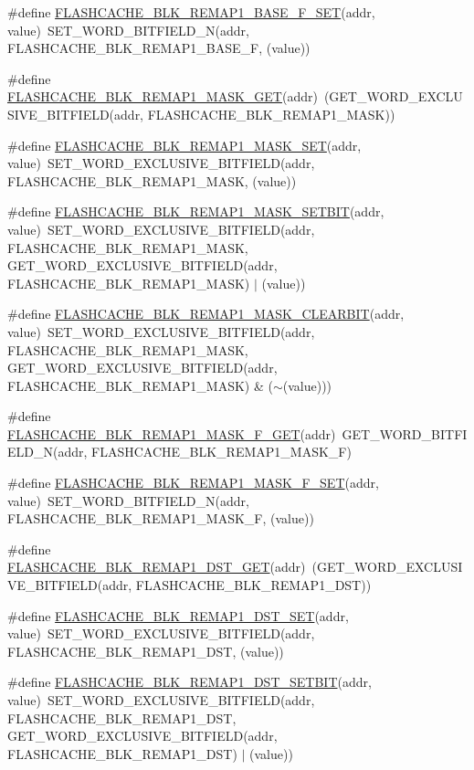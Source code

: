 \begin{DoxyCompactItemize}
\item 
\#define \hyperlink{a00549_a0d1c3dc65ea04ee05f71a5e7f1e5ed96}{FLASHCACHE\_\-BLK\_\-REMAP1\_\-BASE\_\-F\_\-SET}(addr, value)~SET\_\-WORD\_\-BITFIELD\_\-N(addr, FLASHCACHE\_\-BLK\_\-REMAP1\_\-BASE\_\-F, (value))
\item 
\#define \hyperlink{a00549_a02e18632dc84e504028ba479bc95174b}{FLASHCACHE\_\-BLK\_\-REMAP1\_\-MASK\_\-GET}(addr)~(GET\_\-WORD\_\-EXCLUSIVE\_\-BITFIELD(addr, FLASHCACHE\_\-BLK\_\-REMAP1\_\-MASK))
\item 
\#define \hyperlink{a00549_a4732aca9308ee7f76c34768c89ba202b}{FLASHCACHE\_\-BLK\_\-REMAP1\_\-MASK\_\-SET}(addr, value)~SET\_\-WORD\_\-EXCLUSIVE\_\-BITFIELD(addr, FLASHCACHE\_\-BLK\_\-REMAP1\_\-MASK, (value))
\item 
\#define \hyperlink{a00549_acb1fceafb6eef20404392848248e5be6}{FLASHCACHE\_\-BLK\_\-REMAP1\_\-MASK\_\-SETBIT}(addr, value)~SET\_\-WORD\_\-EXCLUSIVE\_\-BITFIELD(addr, FLASHCACHE\_\-BLK\_\-REMAP1\_\-MASK, GET\_\-WORD\_\-EXCLUSIVE\_\-BITFIELD(addr, FLASHCACHE\_\-BLK\_\-REMAP1\_\-MASK) $|$ (value))
\item 
\#define \hyperlink{a00549_aa13c833d086541859eaf0253330d6edc}{FLASHCACHE\_\-BLK\_\-REMAP1\_\-MASK\_\-CLEARBIT}(addr, value)~SET\_\-WORD\_\-EXCLUSIVE\_\-BITFIELD(addr, FLASHCACHE\_\-BLK\_\-REMAP1\_\-MASK, GET\_\-WORD\_\-EXCLUSIVE\_\-BITFIELD(addr, FLASHCACHE\_\-BLK\_\-REMAP1\_\-MASK) \& ($\sim$(value)))
\item 
\#define \hyperlink{a00549_aeb3a4503634ba6d96a2eaf6a365c0958}{FLASHCACHE\_\-BLK\_\-REMAP1\_\-MASK\_\-F\_\-GET}(addr)~GET\_\-WORD\_\-BITFIELD\_\-N(addr, FLASHCACHE\_\-BLK\_\-REMAP1\_\-MASK\_\-F)
\item 
\#define \hyperlink{a00549_a86d6e25f2f41bf8aaf9544f0c4b54798}{FLASHCACHE\_\-BLK\_\-REMAP1\_\-MASK\_\-F\_\-SET}(addr, value)~SET\_\-WORD\_\-BITFIELD\_\-N(addr, FLASHCACHE\_\-BLK\_\-REMAP1\_\-MASK\_\-F, (value))
\item 
\#define \hyperlink{a00549_a702cf670ad53c6ef52d3fab4be3741fd}{FLASHCACHE\_\-BLK\_\-REMAP1\_\-DST\_\-GET}(addr)~(GET\_\-WORD\_\-EXCLUSIVE\_\-BITFIELD(addr, FLASHCACHE\_\-BLK\_\-REMAP1\_\-DST))
\item 
\#define \hyperlink{a00549_ad59872acffe051eb0163b49a3b98d533}{FLASHCACHE\_\-BLK\_\-REMAP1\_\-DST\_\-SET}(addr, value)~SET\_\-WORD\_\-EXCLUSIVE\_\-BITFIELD(addr, FLASHCACHE\_\-BLK\_\-REMAP1\_\-DST, (value))
\item 
\#define \hyperlink{a00549_a5144102165388754d4c9026ea315ef4a}{FLASHCACHE\_\-BLK\_\-REMAP1\_\-DST\_\-SETBIT}(addr, value)~SET\_\-WORD\_\-EXCLUSIVE\_\-BITFIELD(addr, FLASHCACHE\_\-BLK\_\-REMAP1\_\-DST, GET\_\-WORD\_\-EXCLUSIVE\_\-BITFIELD(addr, FLASHCACHE\_\-BLK\_\-REMAP1\_\-DST) $|$ (value))

\end{DoxyCompactItemize}
